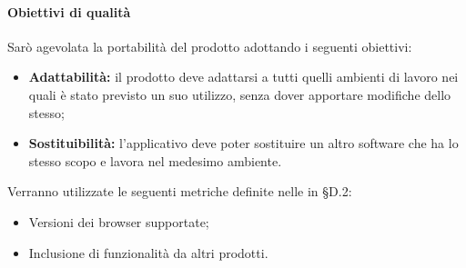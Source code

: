 \documentclass[PianoDiQualifica.tex]{subfiles}
\begin{document}
\paragraph{Obiettivi di qualità}
Sarò agevolata la portabilità del prodotto adottando i seguenti obiettivi:
\begin{itemize}
	\item \textbf{Adattabilità:} il prodotto deve adattarsi a tutti quelli ambienti di lavoro nei quali è stato previsto un suo utilizzo, senza dover apportare modifiche dello stesso;
	\item \textbf{Sostituibilità:} l'applicativo deve poter sostituire un altro software che ha lo stesso scopo e lavora nel medesimo ambiente.
\end{itemize}
Verranno utilizzate le seguenti metriche definite nelle \ndp in \S{D.2}:
\begin{itemize}
	\item {} Versioni dei browser supportate;
	\item {} Inclusione di funzionalità da altri prodotti.
\end{itemize}
\end{document}
